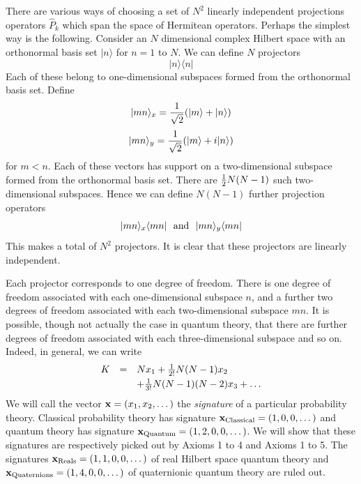 \documentclass[10pt,twocolumn]{article}
\begin{document}
There are various ways of choosing a set of $N^2$ linearly independent
projections operators $\hat{ P}_k$ which span the space of Hermitean
operators.  Perhaps the simplest way is the following. Consider an $N$
dimensional complex Hilbert space with an orthonormal basis set
$|n\rangle$ for $n=1$ to $N$.  We can define $N$ projectors
\begin{equation}\label{nbasis}
     |n\rangle\langle n|
\end{equation}
Each of these belong to one-dimensional subspaces formed from the
orthonormal basis set.  Define
\[ |mn\rangle_x={1\over\sqrt{2}}(|m\rangle + |n\rangle) \]
\[ |mn\rangle_y={1\over\sqrt{2}}(|m\rangle + i|n\rangle) \]
for $m < n$.  Each of these vectors has support on a two-dimensional
subspace formed from the orthonormal basis set.  There are ${1\over 2}
N(N-1)$ such two-dimensional subspaces.  Hence we can define
$N(N-1)$ further projection operators
\begin{equation}\label{mpmn}
 |mn\rangle_x\langle mn| ~~{\rm and}~~ |mn\rangle_y\langle mn|
\end{equation}
This makes a total of $N^2$ projectors. It is clear that these
projectors are linearly independent.

Each projector corresponds to one degree of freedom.  There is one
degree of freedom associated with each one-dimensional subspace $n$, and a
further two degrees of freedom associated with each two-dimensional
subspace $mn$.  It is possible, though not actually the case in quantum
theory, that there are further
degrees of freedom associated with each three-dimensional subspace and
so on.  Indeed, in general, we can write
\begin{equation}
\begin{array}{rcl}
K &= & Nx_1 + {1\over 2!}N(N-1)x_2 \\[3pt]
{} & {} &+ {1\over3!}N(N-1)(N-2)x_3 + \dots
\end{array}
\end{equation}
We will call the vector ${\bf x}=(x_1,x_2,\dots)$ the {\it signature} of
a particular probability theory.  Classical probability theory has
signature ${\bf x}_{\rm Classical}=(1,0,0,\dots)$ and quantum theory has
signature ${\bf x}_{\rm Quantum}=(1,2,0,0,\dots)$.  We will show that
these signatures are respectively picked out by Axioms 1 to 4 and Axioms
1 to 5.  The signatures ${\bf x}_{\rm Reals}=(1,1,0,0,\dots)$ of real
Hilbert space quantum theory and ${\bf x}_{\rm
Quaternions}=(1,4,0,0,\dots)$ of quaternionic quantum theory are ruled out.
\end{document}
